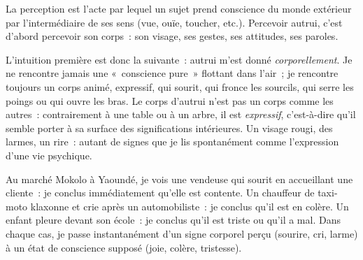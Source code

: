 \documentclass[11pt]{article}
\newcommand{\cle}[1]{{\popxbold\color{popdark}#1}}
\begin{document}
\begin{definition}[La perception]
La perception est l'acte par lequel un sujet prend conscience du monde extérieur par l'intermédiaire de ses sens (vue, ouïe, toucher, etc.). Percevoir autrui, c'est d'abord percevoir son \cle{corps}~: son visage, ses gestes, ses attitudes, ses paroles.
\end{definition}

L'intuition première est donc la suivante~: autrui m'est donné \emph{corporellement}. Je ne rencontre jamais une «~conscience pure~» flottant dans l'air~; je rencontre toujours un corps animé, expressif, qui sourit, qui fronce les sourcils, qui serre les poings ou qui ouvre les bras. Le corps d'autrui n'est pas un corps comme les autres~: contrairement à une table ou à un arbre, il est \emph{expressif}, c'est-à-dire qu'il semble porter à sa surface des significations intérieures. Un visage rougi, des larmes, un rire~: autant de \cle{signes} que je lis spontanément comme l'expression d'une vie psychique.

\begin{exemplebox}
Au marché Mokolo à Yaoundé, je vois une vendeuse qui sourit en accueillant une cliente~: je conclus immédiatement qu'elle est contente. Un chauffeur de taxi-moto klaxonne et crie après un automobiliste~: je conclus qu'il est en colère. Un enfant pleure devant son école~: je conclus qu'il est triste ou qu'il a mal. Dans chaque cas, je passe instantanément d'un signe corporel perçu (sourire, cri, larme) à un état de conscience supposé (joie, colère, tristesse).
\end{exemplebox}
\end{document}

